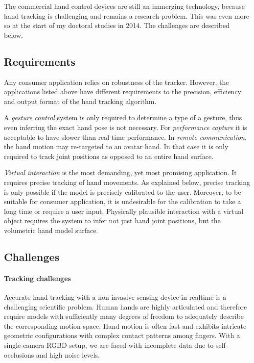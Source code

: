 The commercial hand control devices are still an immerging technology, because hand tracking is challenging and remains a research problem. This was even more so at the start of my doctoral studies in 2014. The challenges are described below.

\subsection*{Requirements}

Any consumer application relies on robustness of the tracker. However, the applications listed above have different requirements to the precision, efficiency and output format of the hand tracking algorithm.

A \textit{gesture control} system is only required to determine a type of a gesture, thus even inferring the exact hand pose is not necessary. For \textit{performance capture} it is acceptable to have slower than real time performance. In \textit{remote communication}, the hand motion may re-targeted to an avatar hand. In that case it is only required to track joint positions as opposed to an entire hand surface.

\textit{Virtual interaction} is the most demanding, yet most promising application. It requires precise tracking of hand movements. As explained below, precise tracking is only possible if the model is precisely calibrated to the user. Moreover, to be suitable for consumer application, it is undesirable for the calibration to take a long time or require a user input. Physically plausible interaction with a virtual object requires the system to infer not just hand joint positions, but the volumetric hand model surface.

\subsection*{Challenges}

\paragraph{Tracking challenges} Accurate hand tracking with a non-invasive sensing device in realtime is a challenging scientific problem. Human hands are highly articulated and therefore require models with sufficiently many degrees of freedom to adequately describe the corresponding motion space. Hand motion is often fast and exhibits intricate geometric configurations with complex contact patterns among fingers. With a single-camera RGBD setup, we are faced with incomplete data due to self-occlusions and high noise levels.  

